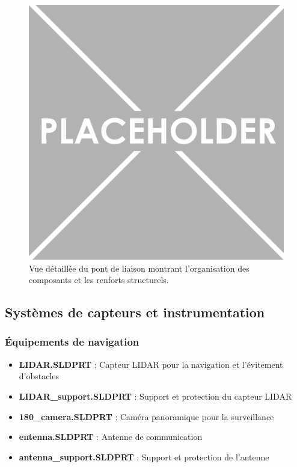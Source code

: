 {\begin{figure}[!htpb]
    \centering
    \includegraphics[width=\linewidth]{Figures/PezizaTuberosa.jpg}
    \caption[Détail du pont de liaison]{Vue détaillée du pont de liaison montrant l'organisation des composants et les renforts structurels.}
    \label{fig:cross-deck-detail}
\end{figure}

\subsection{Systèmes de capteurs et instrumentation}
\subsubsection{Équipements de navigation}
\begin{itemize}
    \setlength{\itemsep}{.375em}
    \item \textbf{LIDAR.SLDPRT} : Capteur LIDAR pour la navigation et l'évitement d'obstacles
    \item \textbf{LIDAR\_support.SLDPRT} : Support et protection du capteur LIDAR
    \item \textbf{180\_camera.SLDPRT} : Caméra panoramique pour la surveillance
    \item \textbf{entenna.SLDPRT} : Antenne de communication
    \item \textbf{antenna\_support.SLDPRT} : Support et protection de l'antenne
\end{itemize}

}
